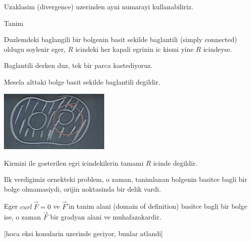 \documentclass[12pt,fleqn]{article}\usepackage{../common}
\begin{document}
Uzaklasim (divergence) uzerinden ayni numarayi kullanabiliriz. 

Tanim 

Duzlemdeki baglangili bir bolgenin basit sekilde baglantili (simply
connected) oldugu soylenir eger, $R$ icindeki her kapali egrinin ic kismi
yine $R$ icindeyse. 

Baglantili derken duz, tek bir parca kastediyoruz.

Mesela alttaki bolge basit sekilde baglantili degildir. 

\includegraphics[height=3cm]{24_7.png}

Kirmizi ile gosterilen egri icindekilerin tamami $R$ icinde degildir. 

Ilk verdigimiz ornekteki problem, o zaman, tanimlanan bolgenin basitce
bagli bir bolge olmamasiydi, orijin noktasinda bir delik vardi. 

Eger $curl \ \vec{F} = 0$ ve $\vec{F}$'in tanim alani (domain of definition) basitce bagli 
bir bolge ise, o zaman $\vec{F}$ bir gradyan alani ve muhafazakardir. 

[hoca eksi konularin uzerinde geciyor, bunlar atlandi]
\end{document}
